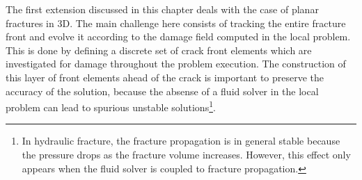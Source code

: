 The first extension discussed in this chapter deals with the case of planar fractures in 3D. The main challenge here consists of tracking the entire fracture front and evolve it according to the damage field computed in the local problem. This is done by defining a discrete set of crack front elements which are investigated for damage throughout the problem execution. The construction of this layer of front elements ahead of the crack is important to preserve the accuracy of the solution, because the absense of a fluid solver in the local problem can lead to spurious unstable solutions\footnote{In hydraulic fracture, the fracture propagation is in general stable because the pressure drops as the fracture volume increases. However, this effect only appears when the fluid solver is coupled to fracture propagation.}.  